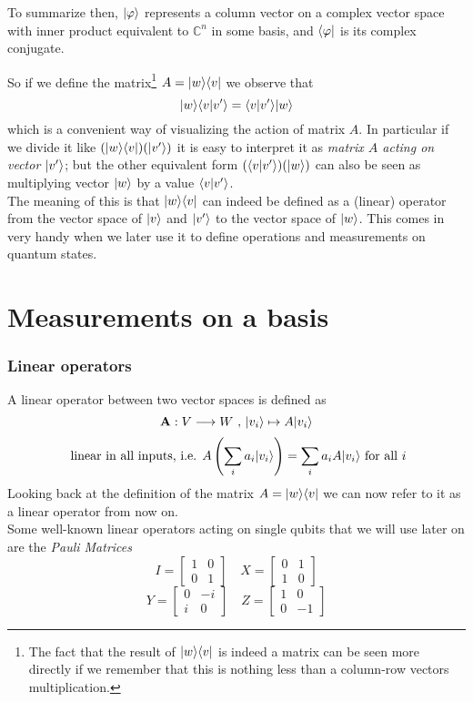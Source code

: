	To summarize then, $|\varphi \rangle$ represents a column vector on a complex vector space with inner product equivalent to $\mathbb{C}^n$ in some basis, and $\langle \varphi|$ is its complex conjugate.
	
	
	So if we define the matrix\footnote{The fact that the result of  $ |w \rangle\langle v| $ is indeed a matrix can be seen more directly if we remember that this is nothing less than a column-row vectors multiplication.} $A =  |w \rangle\langle v| $ we observe that
	$$ |w \rangle\langle v|v'\rangle = \langle v|v'\rangle|w \rangle $$	
	which is a convenient way of visualizing the action of matrix $A$. In particular if we divide it like $(|w \rangle\langle v|) (|v' \rangle) $ it is easy to interpret it as \textit{matrix $A$ acting on vector $|v' \rangle$}; but the other equivalent form $(\langle v|v'\rangle)(|w \rangle)$ can also be seen as multiplying vector $|w \rangle$ by a value $\langle v|v'\rangle$. \\
	The meaning of this is that $|w \rangle\langle v|$ can indeed be defined as a (linear) operator from the vector space of $|v \rangle$ and $|v' \rangle$ to the vector space of $|w \rangle$. This comes in very handy when we later use it to define operations and measurements on quantum states.\\
\section{Measurements on a  basis}
    
	\subsubsection*{Linear operators}
	A linear operator between two vector spaces is defined as 
	$$ \mathbf{A}: V\longrightarrow W \text{  ,  }|v_i \rangle\mapsto A|v_i \rangle$$
	$$ \text{ linear in all inputs, i.e.  }  A\left( \sum_i a_i|v_i \rangle\right) = \sum_i a_i A|v_i \rangle \text{  for all } i $$ 
	Looking back at the definition of the matrix $ A = |w \rangle\langle v|$ we can now refer to it as a linear operator from now on. \\
	Some well-known linear operators acting on single qubits that we will use later on are the \textit{Pauli Matrices}
	$$ I = \begin{bmatrix} 1 & 0 \\ 0 & 1 \end{bmatrix}	 \quad   X = \begin{bmatrix} 0 & 1 \\ 1 & 0 \end{bmatrix}$$
	$$ Y= \begin{bmatrix} 0 & -i \\ i & 0 \end{bmatrix}	 \quad   Z = \begin{bmatrix} 1 & 0 \\ 0 & -1 \end{bmatrix}$$
	
